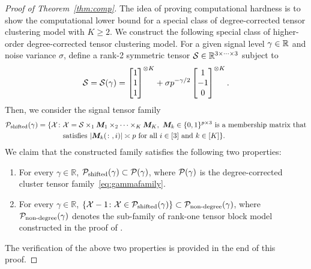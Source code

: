 \documentclass[lettersize,journal]{IEEEtran}
\theoremstyle{definition}
\theoremstyle{definition}
\begin{document}
\begin{proof}[Proof of Theorem~\ref{thm:comp}]
The idea of proving computational hardness is to show the computational lower bound for a special class of degree-corrected tensor clustering model with $K\geq 2$. We construct the following special class of higher-order degree-corrected tensor clustering  model. For a given signal level $\gamma\in\mathbb{R}$ and noise variance $\sigma$, define a rank-2 symmetric tensor $\mathcal{S}\in\mathbb{R}^{3\times \cdots\times 3}$ subject to
\begin{equation}\label{eq:S}
\tS=\tS(\gamma) = \begin{bmatrix}
		1\\
		1\\
		1
		\end{bmatrix}^{\otimes K}
+\sigma p^{-\gamma/2} \begin{bmatrix}
		1\\
		-1\\
		0
	\end{bmatrix}^{\otimes K}.
\end{equation}
Then, we consider the signal tensor family
\begin{align}
\mathcal{P}_{\text{shifted}}(\gamma)=\{\mathcal{X}\colon & \mathcal{X}=\mathcal{S}\times_1\bm M_1\times_2 \cdots \times_K\bm M_K,\  \text{$\bm M_k\in\{0,1\}^{p\times 3}$ is a membership matrix that}
\\
& \text{satisfies $|\bm M_k(\colon,i)|\asymp p$ for all $i\in[3]$ and $k\in[K]$}\}.
\end{align}
We claim that the constructed family satisfies the following two properties:
\begin{enumerate}[wide,label=(\roman*)]
    \item For every $\gamma\in \mathbb{R}$, $\mathcal{P}_{\text{shifted}}(\gamma)\subset \mathcal{P}(\gamma)$, where $\mathcal{P}(\gamma)$ is the degree-corrected cluster tensor family~\eqref{eq:gammafamily}.
    \item For every $\gamma\in \mathbb{R}$, $\{\mathcal{X}-1\colon \mathcal{X}\in \mathcal{P}_{\text{shifted}}(\gamma)\}\subset \mathcal{P}_{\text{non-degree}}(\gamma)$, where $\mathcal{P}_{\text{non-degree}}(\gamma)$ denotes the sub-family of rank-one tensor block model constructed in the proof of \citet[Theorem 7]{han2020exact}. 
\end{enumerate}
The verification of the above two properties is provided in the end of this proof. 


\end{proof}
\end{document}
